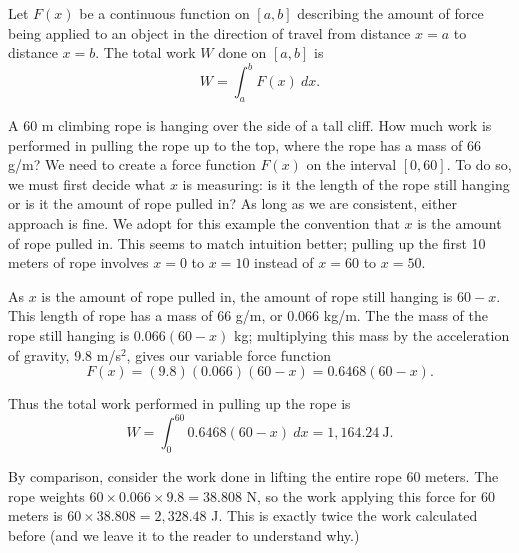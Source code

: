 \begin{keyidea}[Work]\label{idea:work}
Let $F(x)$ be a continuous function on $[a,b]$ describing the amount of force being applied to an object in the direction of travel from distance $x=a$ to distance $x=b$. The total work $W$ done on $[a,b]$ is
\[W = \int_a^b F(x)\ dx.\]
\end{keyidea}


\begin{example}\label{ex_work1}
A 60 m climbing rope is hanging over the side of a tall cliff. How much work is performed in pulling the rope up to the top, where the rope has a mass of 66 g/m? 
\solution
We need to create a force function $F(x)$ on the interval $[0,60]$. To do so, we must first decide what $x$ is measuring: is it the length of the rope still hanging or is it the amount of rope pulled in? As long as we are consistent, either approach is fine. We adopt for this example the convention that $x$ is the amount of rope pulled in. This seems to match intuition better; pulling up the first 10 meters of rope involves $x=0$ to $x=10$ instead of $x=60$ to $x=50$. 

As $x$ is the amount of rope pulled in, the amount of rope still hanging is $60-x$. This length of rope has a mass of 66 g/m, or $0.066$ kg/m. The the mass of the rope still hanging is $0.066(60-x)$ kg; multiplying this mass by the acceleration of gravity, 9.8 m/s$^2$, gives our variable force function
\[F(x) = (9.8)(0.066)(60-x) = 0.6468(60-x).\]

Thus the total work performed in pulling up the rope is 
\[W = \int_0^{60} 0.6468(60-x)\ dx = 1,164.24\ \text{J}.\]

By comparison, consider the work done in lifting the entire rope 60 meters. The rope weights $60\times 0.066 \times 9.8 = 38.808$ N, so the work applying this force for 60 meters is $60\times 38.808 = 2,328.48$ J. This is exactly twice the work calculated before (and we leave it to the reader to understand why.)
\end{example}

